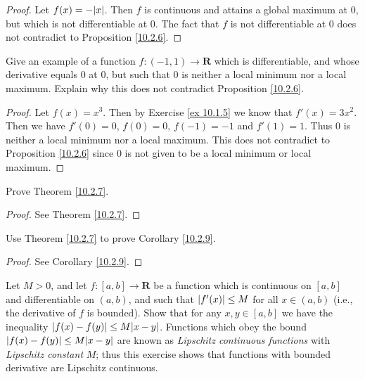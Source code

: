 \begin{proof}
    Let \(f(x) = -\abs*{x}\).
    Then \(f\) is continuous and attains a global maximum at \(0\), but which is not differentiable at \(0\).
    The fact that \(f\) is not differentiable at \(0\) does not contradict to Proposition \ref{10.2.6}.
\end{proof}

\begin{exercise}\label{ex 10.2.3}
    Give an example of a function \(f : (-1, 1) \to \mathbf{R}\) which is differentiable, and whose derivative equals \(0\) at \(0\), but such that \(0\) is neither a local minimum nor a local maximum.
    Explain why this does not contradict Proposition \ref{10.2.6}.
\end{exercise}

\begin{proof}
    Let \(f(x) = x^3\).
    Then by Exercise \ref{ex 10.1.5} we know that \(f'(x) = 3x^2\).
    Then we have \(f'(0) = 0\), \(f(0) = 0\), \(f(-1) = -1\) and \(f'(1) = 1\).
    Thus \(0\) is neither a local minimum nor a local maximum.
    This does not contradict to Proposition \ref{10.2.6} since \(0\) is not given to be a local minimum or local maximum.
\end{proof}

\begin{exercise}\label{ex 10.2.4}
    Prove Theorem \ref{10.2.7}.
\end{exercise}

\begin{proof}
    See Theorem \ref{10.2.7}.
\end{proof}

\begin{exercise}\label{ex 10.2.5}
    Use Theorem \ref{10.2.7} to prove Corollary \ref{10.2.9}.
\end{exercise}

\begin{proof}
    See Corollary \ref{10.2.9}.
\end{proof}

\begin{exercise}\label{ex 10.2.6}
    Let \(M > 0\), and let \(f : [a, b] \to \mathbf{R}\) be a function which is continuous on \([a, b]\) and differentiable on \((a, b)\), and such that \(\abs*{f'(x)} \leq M\) for all \(x \in (a, b)\) (i.e., the derivative of \(f\) is bounded).
    Show that for any \(x, y \in [a, b]\) we have the inequality \(\abs*{f(x) - f(y)} \leq M \abs*{x - y}\).
    Functions which obey the bound \(\abs*{f(x) - f(y)} \leq M \abs*{x - y}\) are known as \emph{Lipschitz continuous functions} with \emph{Lipschitz constant} \(M\);
    thus this exercise shows that functions with bounded derivative are Lipschitz continuous.
\end{exercise}

